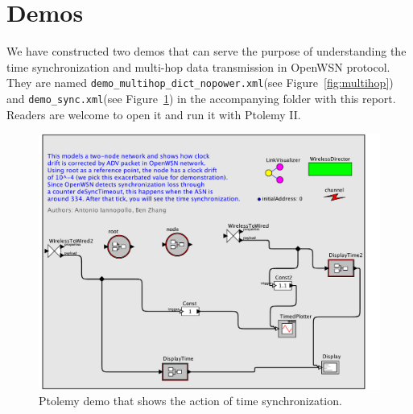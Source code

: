 \appendix
\section{Demos}

We have constructed two demos that can serve the purpose of understanding the time synchronization and multi-hop data transmission in OpenWSN protocol. They are named \verb+demo_multihop_dict_nopower.xml+(see Figure~\ref{fig:multihop}) and \verb+demo_sync.xml+(see Figure~\ref{fig:timesync}) in the accompanying folder with this report. Readers are welcome to open it and run it with Ptolemy II. 

\begin{figure}[t]
\centering
\includegraphics[width=0.9\columnwidth]{figures/PaperDemoSync}
\caption{Ptolemy demo that shows the action of time synchronization.}
\label{fig:timesync}
\end{figure}


